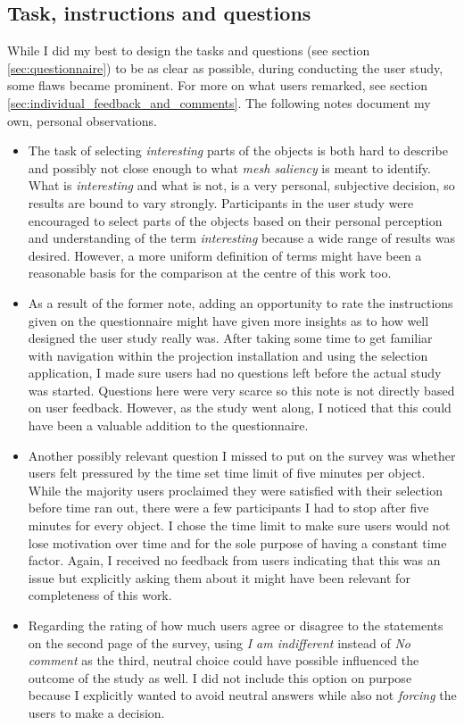 		\subsection{Task, instructions and questions}
		\label{sec:task_instructions_questions}
While I did my best to design the tasks and questions (see section \ref{sec:questionnaire}) to be as clear as possible, during conducting the user study, some flaws became prominent. For more on what users remarked, see section \ref{sec:individual_feedback_and_comments}. The following notes document my own, personal observations.

\begin{itemize}
	\item The task of selecting \textit{interesting} parts of the objects is both hard to describe and possibly not close enough to what \textit{mesh saliency} is meant to identify. What is \textit{interesting} and what is not, is a very personal, subjective decision, so results are bound to vary strongly. Participants in the user study were encouraged to select parts of the objects based on their personal perception and understanding of the term \textit{interesting} because a wide range of results was desired. However, a more uniform definition of terms might have been a reasonable basis for the comparison at the centre of this work too.
	\item As a result of the former note, adding an opportunity to rate the instructions given on the questionnaire might have given more insights as to how well designed the user study really was. After taking some time to get familiar with navigation within the projection installation and using the selection application, I made sure users had no questions left before the actual study was started. Questions here were very scarce so this note is not directly based on user feedback. However, as the study went along, I noticed that this could have been a valuable addition to the questionnaire.
	\item Another possibly relevant question I missed to put on the survey was whether users felt pressured by the time set time limit of five minutes per object. While the majority users proclaimed they were satisfied with their selection before time ran out, there were a few participants I had to stop after five minutes for every object. I chose the time limit to make sure users would not lose motivation over time and for the sole purpose of having a constant time factor. Again, I received no feedback from users indicating that this was an issue but explicitly asking them about it might have been relevant for completeness of this work.
	\item Regarding the rating of how much users agree or disagree to the statements on the second page of the survey, using \textit{I am indifferent} instead of \textit{No comment} as the third, neutral choice could have possible influenced the outcome of the study as well. I did not include this option on purpose because I explicitly wanted to avoid neutral answers while also not \textit{forcing} the users to make a decision.
\end{itemize}

